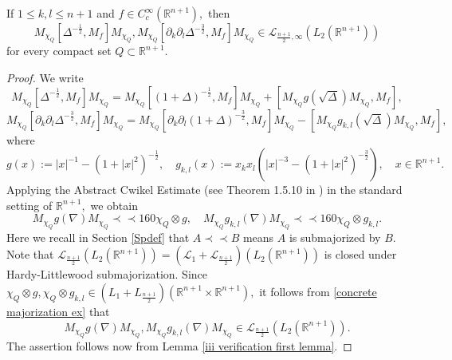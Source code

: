 \documentclass[12pt]{amsart}
\begin{document}
\begin{lemma}\label{iii verification second lemma} If $1\leq k,l\leq n+1$ and $f\in C^{\infty}_c(\mathbb{R}^{n+1}),$ then
$$M_{\chi_Q}[\Delta^{-\frac12},M_f]M_{\chi_Q},M_{\chi_Q}[\partial_k\partial_l\Delta^{-\frac32},M_f]M_{\chi_Q}\in \mathcal{L}_{\frac{n+1}{2},\infty}(L_2(\mathbb{R}^{n+1}))$$
for every compact set $Q\subset\mathbb{R}^{n+1}.$
\end{lemma}
\begin{proof} We write
$$M_{\chi_Q}[\Delta^{-\frac12},M_f]M_{\chi_Q}=M_{\chi_Q}[(1+\Delta)^{-\frac12},M_f]M_{\chi_Q}+[M_{\chi_Q}g(\sqrt{\Delta})M_{\chi_Q},M_f],$$
$$M_{\chi_Q}[\partial_k\partial_l\Delta^{-\frac32},M_f]M_{\chi_Q}=M_{\chi_Q}[\partial_k\partial_l(1+\Delta)^{-\frac32},M_f]M_{\chi_Q}-[M_{\chi_Q}g_{k,l}(\sqrt{\Delta})M_{\chi_Q},M_f],$$		
where
$$g(x):=|x|^{-1}-(1+|x|^2)^{-\frac12},\quad g_{k,l}(x):=x_kx_l(|x|^{-3}-(1+|x|^2)^{-\frac32}),\quad x\in\mathbb{R}^{n+1}.$$
Applying the Abstract Cwikel Estimate (see Theorem 1.5.10 in \cite{LSZ2}) in the standard setting of $\mathbb{R}^{n+1},$ we obtain
\begin{equation}\label{concrete majorization ex}
M_{\chi_Q}g(\nabla)M_{\chi_Q}\prec\prec 160\chi_Q\otimes g,\quad M_{\chi_Q}g_{k,l}(\nabla)M_{\chi_Q}\prec\prec 160\chi_Q\otimes g_{k,l}.
\end{equation}
Here we recall in Section \ref{Spdef} that $ A \prec\prec B$ means $A$ is submajorized by $B.$ {\color{blue}Note that $\mathcal{L}_{\frac{n+1}{2}}(L_2(\mathbb{R}^{n+1}))=(\mathcal{L}_1+\mathcal{L}_{\frac{n+1}{2}})(L_2(\mathbb{R}^{n+1}))$ is closed under Hardy-Littlewood submajorization. Since $\chi_Q\otimes g,\chi_Q\otimes g_{k,l}\in (L_1+L_{\frac{n+1}{2}})(\mathbb{R}^{n+1}\times\mathbb{R}^{n+1}),$ it follows from \eqref{concrete majorization ex} that
$$M_{\chi_Q}g(\nabla)M_{\chi_Q},M_{\chi_Q}g_{k,l}(\nabla)M_{\chi_Q}\in\mathcal{L}_{\frac{n+1}{2}}(L_2(\mathbb{R}^{n+1})).$$
}The assertion follows now from Lemma \ref{iii verification first lemma}.
\end{proof}
\end{document}
